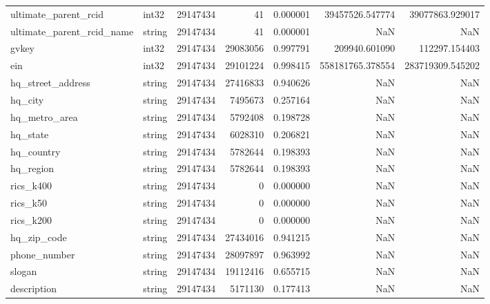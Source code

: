 \documentclass{article}
\begin{document}
\begin{longtable}{llrrrrr}
ultimate_parent_rcid & int32 & 29147434 & 41 & 0.000001 & 39457526.547774 & 39077863.929017 \\
ultimate_parent_rcid_name & string & 29147434 & 41 & 0.000001 & NaN & NaN \\
gvkey & int32 & 29147434 & 29083056 & 0.997791 & 209940.601090 & 112297.154403 \\
ein & int32 & 29147434 & 29101224 & 0.998415 & 558181765.378554 & 283719309.545202 \\
hq_street_address & string & 29147434 & 27416833 & 0.940626 & NaN & NaN \\
hq_city & string & 29147434 & 7495673 & 0.257164 & NaN & NaN \\
hq_metro_area & string & 29147434 & 5792408 & 0.198728 & NaN & NaN \\
hq_state & string & 29147434 & 6028310 & 0.206821 & NaN & NaN \\
hq_country & string & 29147434 & 5782644 & 0.198393 & NaN & NaN \\
hq_region & string & 29147434 & 5782644 & 0.198393 & NaN & NaN \\
rics_k400 & string & 29147434 & 0 & 0.000000 & NaN & NaN \\
rics_k50 & string & 29147434 & 0 & 0.000000 & NaN & NaN \\
rics_k200 & string & 29147434 & 0 & 0.000000 & NaN & NaN \\
hq_zip_code & string & 29147434 & 27434016 & 0.941215 & NaN & NaN \\
phone_number & string & 29147434 & 28097897 & 0.963992 & NaN & NaN \\
slogan & string & 29147434 & 19112416 & 0.655715 & NaN & NaN \\
description & string & 29147434 & 5171130 & 0.177413 & NaN & NaN \\
\end{longtable}
\end{document}
